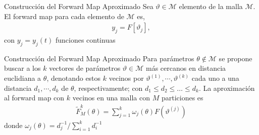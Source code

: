 \documentclass[10pt,aspectratio=169]{beamer}
\begin{document}
\begin{frame}{Construcción del Forward Map Aproximado}
  Sea $\vartheta \in \mathcal{M} $ elemento de la malla $\mathcal{M}$. El forward map para cada elemento de $\mathcal{M}$ es, 
  \begin{align*}
    y_j = F[\vartheta_j],
  \end{align*}
  con $y_j = y_j(t)$ funciones continuas
  
  
\end{frame}

\begin{frame}{Construcción del Forward Map Aproximado}
  Para parámetros $\theta \notin \mathcal{M}$ se propone buscar a los $k$ vectores de parámetros $\vartheta \in \mathcal{M}$ más cercanos en distancia euclidiana a $\theta$, denotando estos $k$ vecinos por $\vartheta^{(1)}, \cdots, \vartheta^{(k)}$ cada uno a una distancia $d_1, \cdots, d_k$ de $\theta$, respectivamente; con $d_1 \leq d_2 \leq \dots \leq d_k$. La aproximación al forward map con $k$ vecinos en una malla con $M$ particiones es
  \begin{align}
    \tilde{F}^{k}_M(\theta) = \sum_{j = 1}^{k} \omega_j(\theta) F \left(\vartheta^{(j)}\right)
    \label{2.4.01}
  \end{align}
  donde $\omega_j(\theta) = d_j^{-1}/ \sum_{i=1}^{k} d_i^{-1}$
\end{frame}





















\begin{frame}
  
\end{frame}

\begin{frame}
  
\end{frame}

\begin{frame}
  
\end{frame}

\begin{frame}
  
\end{frame}
\end{document}
